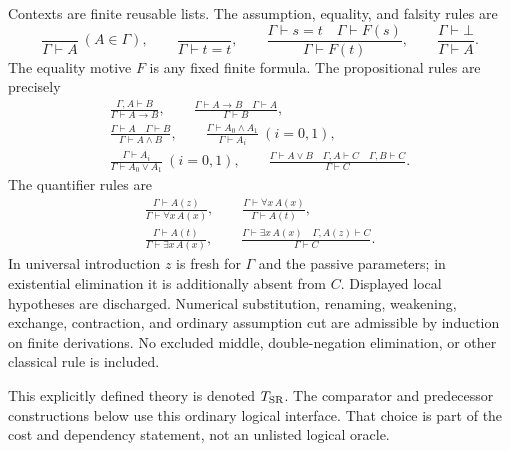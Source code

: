 Contexts are finite reusable lists. The assumption, equality, and falsity
rules are
\[
 \frac{}{\Gamma\vdash A}\ (A\in\Gamma),\qquad
 \frac{}{\Gamma\vdash t=t},\qquad
 \frac{\Gamma\vdash s=t\quad\Gamma\vdash F(s)}{\Gamma\vdash F(t)},\qquad
 \frac{\Gamma\vdash\bot}{\Gamma\vdash A}.
\]
The equality motive $F$ is any fixed finite formula. The propositional
rules are precisely
\[
\begin{gathered}
 \frac{\Gamma,A\vdash B}{\Gamma\vdash A\to B},\qquad
 \frac{\Gamma\vdash A\to B\quad\Gamma\vdash A}{\Gamma\vdash B},\\[5pt]
 \frac{\Gamma\vdash A\quad\Gamma\vdash B}{\Gamma\vdash A\land B},\qquad
 \frac{\Gamma\vdash A_0\land A_1}{\Gamma\vdash A_i}\ (i=0,1),\\[5pt]
 \frac{\Gamma\vdash A_i}{\Gamma\vdash A_0\lor A_1}\ (i=0,1),\qquad
 \frac{\Gamma\vdash A\lor B\quad\Gamma,A\vdash C\quad\Gamma,B\vdash C}
      {\Gamma\vdash C}.
\end{gathered}
\]
The quantifier rules are
\[
\begin{gathered}
 \frac{\Gamma\vdash A(z)}{\Gamma\vdash\forall x\,A(x)},\qquad
 \frac{\Gamma\vdash\forall x\,A(x)}{\Gamma\vdash A(t)},\\[5pt]
 \frac{\Gamma\vdash A(t)}{\Gamma\vdash\exists x\,A(x)},\qquad
 \frac{\Gamma\vdash\exists x\,A(x)\quad\Gamma,A(z)\vdash C}
      {\Gamma\vdash C}.
\end{gathered}
\]
In universal introduction $z$ is fresh for $\Gamma$ and the passive
parameters; in existential elimination it is additionally absent from
$C$. Displayed local hypotheses are discharged. Numerical substitution,
renaming, weakening, exchange, contraction, and ordinary assumption cut
are admissible by induction on finite derivations. No excluded middle,
double-negation elimination, or other classical rule is included.

This explicitly defined theory is denoted $T_{\rm SR}$. The comparator
and predecessor constructions below use this ordinary logical interface.
That choice is part of the cost and dependency statement, not an
unlisted logical oracle.
